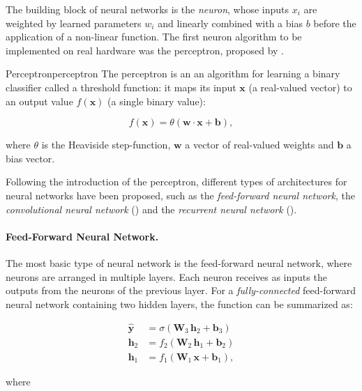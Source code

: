 The building block of neural networks is the \emph{neuron}, whose inputs $x_i$ are weighted by learned parameters $w_i$ and linearly combined with a bias $b$ before the application of a non-linear function. The first neuron algorithm to be implemented on real hardware was the perceptron, proposed by \citet{rosenblatt1958perceptron}.

\begin{defi}{Perceptron}{perceptron}
The perceptron is an an algorithm for learning a binary classifier called a threshold function: it maps its input $\mathbf{x}$ (a real-valued vector) to an output value $f(\mathbf{x})$ (a single binary value):

\[ f(\mathbf{x}) = \theta (\mathbf{w} \cdot \mathbf{x} + \mathbf{b}) , \]

where $\theta$ is the Heaviside step-function, $\mathbf{w}$ a vector of real-valued weights and $\mathbf{b}$ a bias vector.
\end{defi}

Following the introduction of the perceptron, different types of architectures for neural networks have been proposed, such as the \emph{feed-forward neural network}, the \emph{convolutional neural network} (\cnn) and the \emph{recurrent neural network} (\rnn).

\paragraph{Feed-Forward Neural Network.}

The most basic type of neural network is the feed-forward neural network, where neurons are arranged in multiple layers. Each neuron receives as inputs the outputs from the neurons of the previous layer. For a \emph{fully-connected} feed-forward neural network containing two hidden layers, the function can be summarized as:

\begin{align*}
    \hat{\mathbf{y}} & = \sigma(\mathbf{W}_3 \, \mathbf{h}_2 + \mathbf{b}_3 ) \\
    \mathbf{h}_2     & = f_2(\mathbf{W}_2 \, \mathbf{h}_1 + \mathbf{b}_2 ) \\
    \mathbf{h}_1     & = f_1(\mathbf{W}_1 \, \mathbf{x} + \mathbf{b}_1 ) ,
\end{align*}

where 


